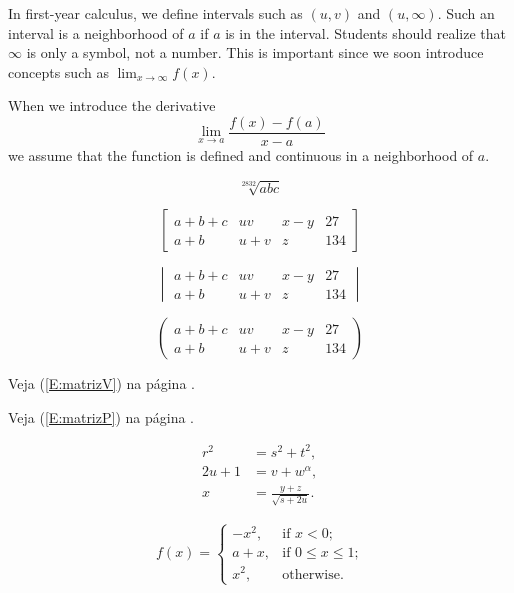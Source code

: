 \documentclass{sample}
\begin{document}
In first-year calculus, we define intervals such as $(u, v)$ and $(u, \infty)$. Such an interval
is a neighborhood of $a$ if $a$ is in the interval. Students should realize that $\infty$ is only
a symbol, not a number. This is important since we soon introduce concepts such as $\lim_{x \to \infty} f(x)$.

When we introduce the derivative
\[ %
    \lim_{x \to a}\frac{f(x) - f(a)}{x - a}
\]
we assume that the function is defined and continuous in a neighborhood of $a$.

\[
    \sqrt[2832]{abc}
\]

\[
    \begin{bmatrix}
        a + b + c & uv    & x - y & 27  \\
        a + b     & u + v & z     & 134
    \end{bmatrix}
\]

\begin{equation}\label{E:matrizV}
    \begin{vmatrix}
        a + b + c & uv    & x - y & 27  \\
        a + b     & u + v & z     & 134
    \end{vmatrix}
\end{equation}

\begin{equation}\label{E:matrizP}\tag{tag arbitrária}
    \begin{pmatrix}
        a + b + c & uv    & x - y & 27  \\
        a + b     & u + v & z     & 134
    \end{pmatrix}
\end{equation}


Veja (\ref{E:matrizV}) na página \pageref{E:matrizV}.

Veja (\ref{E:matrizP}) na página \pageref{E:matrizP}.

\begin{align}
    r^2 &= s^2 + t^2,\\
    2u + 1 &= v + w^{\alpha},\\
    x &= \frac{y + z}{\sqrt{s + 2u}}.
\end{align}


\[
    f (x) =
    \begin{cases}
        -x^{2}, &\text{if $x < 0$;}\\
        a + x,  &\text{if $0 \leq x \leq 1$;}\\
        x^2,    &\text{otherwise.}
    \end{cases}
\]
\end{document}
